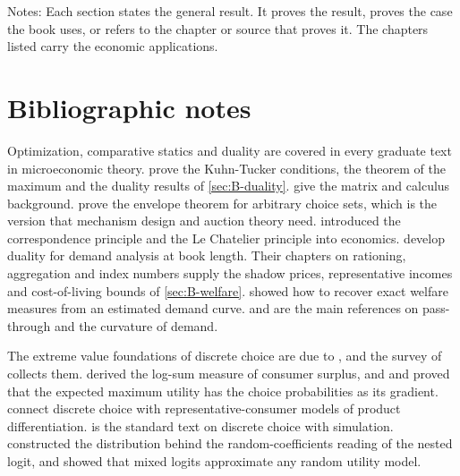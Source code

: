 \begin{table}[!tb]
\medskip
\begin{minipage}{\textwidth}
\footnotesize Notes: Each section states the general result. It proves the result, proves the case the book uses,
or refers to the chapter or source that proves it. The chapters listed carry the economic applications.
\end{minipage}
\end{table}






\section{Bibliographic notes}\label{sec:B-notes}

Optimization, comparative statics and duality are covered in every graduate text in microeconomic theory.
\citet{MasColellWhinstonGreen1995} prove the Kuhn-Tucker conditions, the theorem of the maximum and the duality
results of \cref{sec:B-duality}. \citet{SimonBlume1994} give the matrix and calculus background.
\citet{MilgromSegal2002} prove the envelope theorem for arbitrary choice sets, which is the version that mechanism
design and auction theory need. \citet{Samuelson1947} introduced the correspondence principle and the Le Chatelier
principle into economics. \citet{DeatonMuellbauer1980b} develop duality for demand analysis at book length. Their
chapters on rationing, aggregation and index numbers supply the shadow prices, representative incomes and
cost-of-living bounds of \cref{sec:B-welfare}. \citet{Hausman1981} showed how to recover exact welfare measures from
an estimated demand curve.
\citet{BulowPfleiderer1983} and \citet{WeylFabinger2013} are the main references on pass-through and the curvature
of demand.

The extreme value foundations of discrete choice are due to \citet{McFadden1974, McFadden1978, McFadden1981}, and
the survey of \citet{McFadden1984} collects them. \citet{SmallRosen1981} derived the log-sum measure of consumer
surplus, and \citet{Williams1977} and \citet{DalyZachary1978} proved that the expected maximum utility has the choice
probabilities as its gradient. \citet{AndersonDePalmaThisse1992} connect discrete choice with representative-consumer
models of product differentiation. \citet{Train2009} is the standard text on discrete choice with simulation.
\citet{Cardell1997} constructed the distribution behind the random-coefficients reading of the nested logit, and
\citet{McFaddenTrain2000} showed that mixed logits approximate any random utility model.


